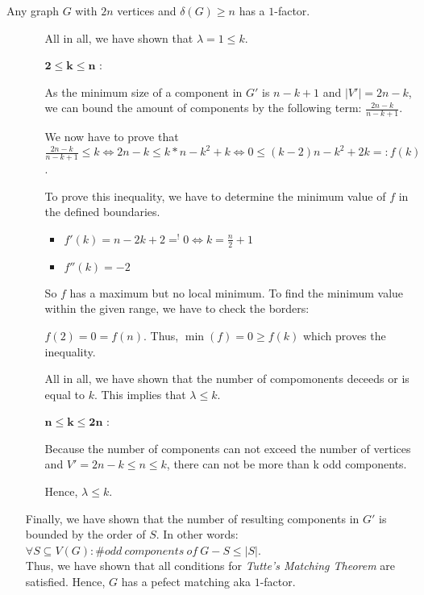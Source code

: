 \documentclass[a4paper]{article}
\begin{document}
\begin{solution}{12}
\begin{theorem}{Any graph $G$ with $2n$ vertices and $\delta(G) \geq n$ has a $1$-factor.}
\begin{itemize}
\begin{itemize}
							All in all, we have shown that $\lambda=1 \leq k$.
						
						\item[$\mathbf{2\leq k \leq n}$]:

							As the minimum size of a component in $G'$ is $n-k+1$ and $|V'|=2n-k$, we can bound the amount of components by the following term: $\frac{2n-k}{n-k+1}$.

							We now have to prove that 
							$\frac{2n-k}{n-k+1} \leq k \iff 2n-k \leq k*n-k^2+k \iff 0 \leq (k-2)n-k^2+2k =: f(k)$.

							To prove this inequality, we have to determine the minimum value of $f$ in the defined boundaries.
							\begin{itemize}
								\item $f'(k)=n-2k+2 =^! 0 \iff k=\frac{n}{2}+1$
								\item $f''(k)=-2$
							\end{itemize}
							So $f$ has a maximum but no local minimum. To find the minimum value within the given range, we have to check the borders:

							$f(2)=0=f(n)$. Thus, $\min(f)=0 \geq f(k)$ which proves the inequality.

							All in all, we have shown that the number of compomonents deceeds or is equal to $k$. This implies that $\lambda \leq k$.
					\item[$\mathbf{n \leq k \leq 2n}$]:

						Because the number of components can not exceed the number of vertices and $V'=2n-k\leq n \leq k$, there can not  be more than k odd components.

						Hence, $\lambda \leq k$.
				\end{itemize}
				Finally, we have shown that the number of resulting components in $G'$ is bounded by the order of $S$.
				In other words: $\forall  S \subseteq V(G): \#odd\ components\ of\ G-S \leq |S|$.\\

				Thus, we have shown that all conditions for \emph{Tutte's Matching Theorem} are satisfied. Hence, $G$ has a pefect matching aka $1$-factor.
			\end{itemize}
		\end{theorem}
	\end{solution}
	
\end{document}
